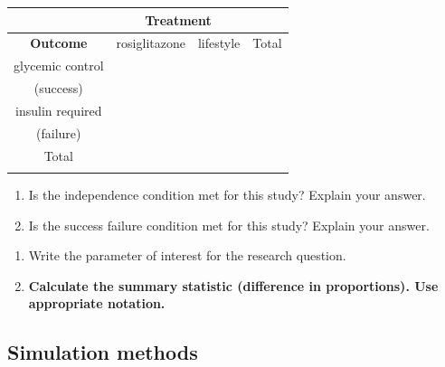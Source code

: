 \documentclass[
]{report}
\begin{document}
\begin{center}
\begin{tabular}{|c|c|c|c|}\hline
 & \multicolumn{2}{|c|}{\textbf{Treatment}} & \\ \hline
\textbf{Outcome} & \hspace{0.35in} rosiglitazone \hspace{0.35in} & \hspace{0.35in} lifestyle \hspace{0.35in} & \hspace{0.35in} Total \hspace{0.35in} \\ \hline
 glycemic control & & & \\ 
 (success) & & & \\ \hline
 insulin required & & & \\ 
 (failure) & & & \\ \hline
 Total & & &  \\ 
 & & & \\ \hline  
\end{tabular}
\end{center}

\begin{enumerate}
\def\labelenumi{\arabic{enumi}.}
\setcounter{enumi}{2}
\item
  Is the independence condition met for this study? Explain your answer.
  \vspace{0.6in}
\item
  Is the success failure condition met for this study? Explain your answer.
\end{enumerate}

\vspace{0.6in}

\begin{enumerate}
\def\labelenumi{\arabic{enumi}.}
\setcounter{enumi}{4}
\item
  Write the parameter of interest for the research question.
  \vspace{0.6in}
\item
  \textbf{Calculate the summary statistic (difference in proportions). Use appropriate notation.}
  \vspace{0.3in}
\end{enumerate}

\subsection*{Simulation methods}\label{simulation-methods-1}
\end{document}
